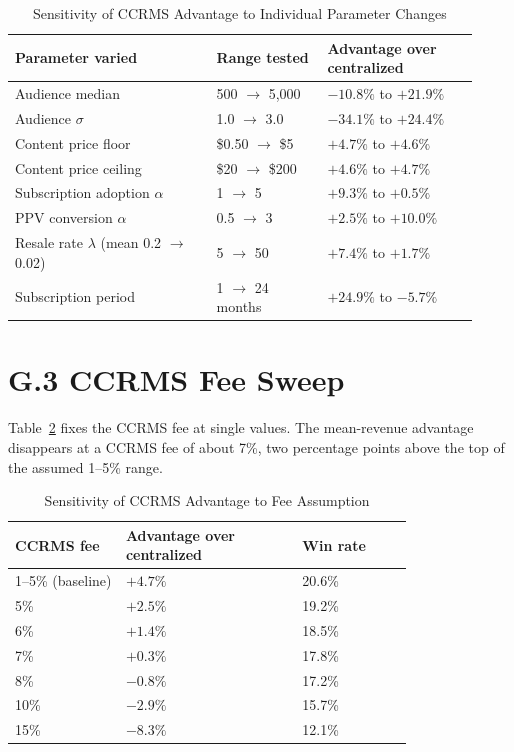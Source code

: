 \begin{table}[h]
\centering
\caption{Sensitivity of CCRMS Advantage to Individual Parameter Changes}\label{tab:sensitivity-grid}
\begin{tabular}{@{}p{0.40\linewidth} p{0.22\linewidth} p{0.30\linewidth}@{}}
\toprule
\textbf{Parameter varied} & \textbf{Range tested} & \textbf{Advantage over centralized} \\
\midrule
Audience median         & 500 $\to$ 5,000      & $-10.8\%$ to $+21.9\%$ \\
Audience $\sigma$       & 1.0 $\to$ 3.0        & $-34.1\%$ to $+24.4\%$ \\
Content price floor     & \$0.50 $\to$ \$5     & $+4.7\%$ to $+4.6\%$ \\
Content price ceiling   & \$20 $\to$ \$200     & $+4.6\%$ to $+4.7\%$ \\
Subscription adoption $\alpha$ & 1 $\to$ 5    & $+9.3\%$ to $+0.5\%$ \\
PPV conversion $\alpha$ & 0.5 $\to$ 3          & $+2.5\%$ to $+10.0\%$ \\
Resale rate $\lambda$ (mean 0.2 $\to$ 0.02) & 5 $\to$ 50 & $+7.4\%$ to $+1.7\%$ \\
Subscription period     & 1 $\to$ 24 months    & $+24.9\%$ to $-5.7\%$ \\
\bottomrule
\end{tabular}
\end{table}

\section*{G.3 CCRMS Fee Sweep}

Table~\ref{tab:fee-sweep} fixes the CCRMS fee at single values. The mean-revenue advantage disappears at a CCRMS fee of about 7\%, two percentage points above the top of the assumed 1--5\% range.

\begin{table}[h]
\centering
\caption{Sensitivity of CCRMS Advantage to Fee Assumption}\label{tab:fee-sweep}
\begin{tabular}{@{}p{0.22\linewidth} p{0.35\linewidth} p{0.22\linewidth}@{}}
\toprule
\textbf{CCRMS fee} & \textbf{Advantage over centralized} & \textbf{Win rate} \\
\midrule
1--5\% (baseline) & $+4.7\%$  & 20.6\% \\
5\%               & $+2.5\%$  & 19.2\% \\
6\%               & $+1.4\%$  & 18.5\% \\
7\%               & $+0.3\%$  & 17.8\% \\
8\%               & $-0.8\%$  & 17.2\% \\
10\%              & $-2.9\%$  & 15.7\% \\
15\%              & $-8.3\%$  & 12.1\% \\
\bottomrule
\end{tabular}
\end{table}

